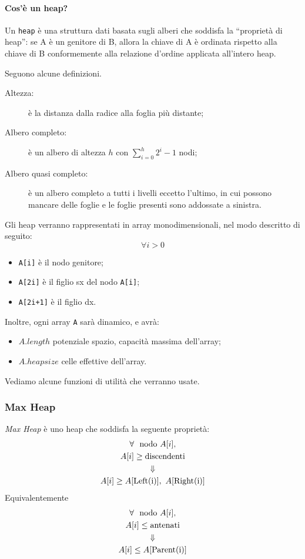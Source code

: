 \paragraph{Cos'è un heap?} Un \texttt{heap} è una struttura dati basata sugli alberi che
soddisfa la ``proprietà di heap'': se A è un genitore di B, allora la chiave di A è ordinata rispetto
alla chiave di B conformemente alla relazione d'ordine applicata all'intero heap.\par
Seguono alcune definizioni.
\begin{description}
	\item[Altezza:] è la distanza dalla radice alla foglia più distante;
	\item[Albero completo:] è un albero di altezza $h$ con $\displaystyle\sum_{i=0}^h 2^i - 1$ nodi;
	\item[Albero quasi completo:] è un albero completo a tutti i livelli eccetto l'ultimo, in cui 
	possono mancare delle foglie e le foglie presenti sono addossate a sinistra.
\end{description}

Gli heap verranno rappresentati in array monodimensionali, nel modo descritto di seguito:
$$\forall i > 0 $$
\begin{itemize}
	\item \texttt{A[i]} è il nodo genitore;
	\item \texttt{A[2i]} è il figlio sx del nodo \texttt{A[i]};
	\item \texttt{A[2i+1]} è il figlio dx.
\end{itemize}
Inoltre, ogni array \texttt{A} sarà dinamico, e avrà:
\begin{itemize}
	\item $A.length$ potenziale spazio, capacità massima dell'array;
	\item $A.heapsize$ celle effettive dell'array.
\end{itemize}

Vediamo alcune funzioni di utilità che verranno usate.




\subsubsection{Max Heap}
\emph{Max Heap} è uno heap che soddisfa la seguente proprietà:
\begin{gather*}
	\forall \text{ nodo } A[i], \\
	A[i] \geq \text{discendenti} \\
	\Downarrow \\
	A[i] \geq A[\text{\emph{Left(i)}}], \ A[\text{\emph{Right(i)}}]
\end{gather*}
Equivalentemente
\begin{gather*}
	\forall \text{ nodo } A[i], \\
	A[i] \leq \text{antenati} \\
	\Downarrow \\
	A[i] \leq A[\text{\emph{Parent(i)}}]
\end{gather*}

